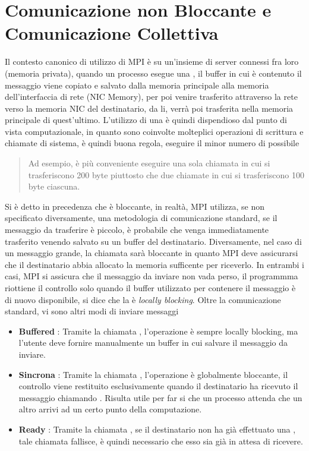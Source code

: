 \documentclass[10pt, letterpaper]{report}
\begin{document}
\section{Comunicazione  non Bloccante e Comunicazione Collettiva}
Il contesto canonico di utilizzo di MPI è su un'insieme di server connessi fra loro (memoria privata), quando un 
processo esegue una , il buffer in cui è contenuto il messaggio viene copiato e salvato dalla memoria 
principale alla memoria dell'interfaccia di rete (NIC Memory), per poi venire trasferito attraverso la rete verso la memoria 
NIC del destinatario, da li, verrà poi trasferita nella memoria principale di quest'ultimo. \acc 
L'utilizzo di una  è quindi dispendioso dal punto di vista computazionale, in quanto sono coinvolte 
molteplici operazioni di scrittura e chiamate di sistema, è quindi buona regola, eseguire il minor numero di 
 possibile\begin{quote}
    \color{gray}
    Ad esempio, è più conveniente eseguire una sola chiamata in cui si trasferiscono 200 byte piuttosto che due chiamate 
    in cui si trasferiscono 100 byte ciascuna.
    \color{black}
\end{quote}
Si è detto in precedenza che  è bloccante, in realtà, MPI utilizza, se non specificato diversamente, 
una metodologia di comunicazione standard, se il messaggio da trasferire è piccolo, è probabile che venga immediatamente 
trasferito venendo salvato su un buffer del destinatario. Diversamente, nel caso di un messaggio grande, la chiamata 
sarà bloccante in quanto MPI deve assicurarsi che il destinatario abbia allocato la memoria sufficente per riceverlo.\acc 
In entrambi i casi, MPI si assicura che il messaggio da inviare non vada perso, il programmma riottiene il controllo 
solo quando il buffer utilizzato per contenere il messaggio è di nuovo disponibile, si dice che la  
è \textit{locally blocking}. Oltre la comunicazione standard, vi sono altri modi di inviare messaggi\begin{itemize}
    \item \textbf{Buffered} : Tramite la chiamata , l'operazione è sempre locally blocking, ma l'utente deve fornire manualmente un 
    buffer in cui salvare il messaggio da inviare. 
    \item \textbf{Sincrona} : Tramite la chiamata , l'operazione è globalmente bloccante, il controllo 
    viene restituito esclusivamente quando il destinatario ha ricevuto il messaggio chiamando . Risulta 
    utile per far si che un processo attenda che un altro arrivi ad un certo punto della computazione. 
    \item \textbf{Ready} : Tramite la chiamata , se il destinatario non ha già effettuato una 
    , tale chiamata fallisce, è quindi necessario che esso sia già in attesa di ricevere.
\end{itemize}
\end{document}
